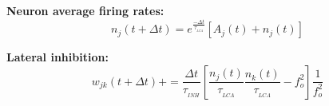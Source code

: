 \documentclass{article}
\begin{document}

{\bf Neuron average firing rates:}
\begin{equation}\label{avgSpikes}
n_{j}(t+\Delta t) = e^{\frac{-\Delta t}{\displaystyle{\tau}_{_{LCA}}}} \left[A_{j}(t) + n_{j}(t)\right]
\end{equation}


{\bf Lateral inhibition:}
\begin{equation}\label{lateralInhib}
w_{jk}(t+\Delta t) += \frac{\Delta t}{\displaystyle{\tau}_{_{INH}}} \left[ \frac{n_{j}(t)}{\displaystyle{\tau}_{_{LCA}}} \frac{n_{k}(t)}{\displaystyle{\tau}_{_{LCA}}} - f_{o}^{2} \right] \frac{1}{f_{o}^{2}}
\end{equation}
\end{document}
